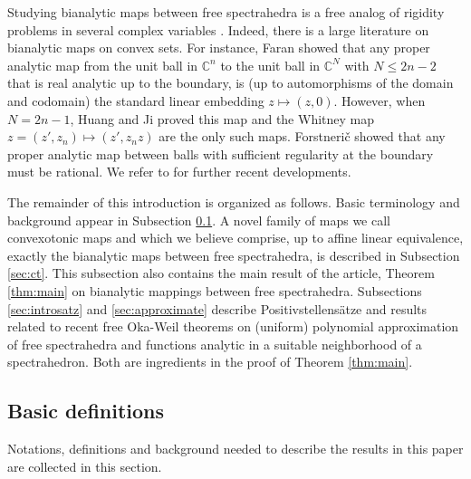 \documentclass[11pt,makeidx]{amsart}
\def\C{ {\mathbb{C}} }
\newcommand{\ct}{convexotonic\xspace}
\begin{document}
Studying bianalytic maps between free spectrahedra is a free analog of rigidity problems in  several complex variables \cite{DAn,For89,For,HJ01,HJY14,Krantz}. Indeed, there is a large literature  on bianalytic maps on convex sets. 
For instance, Faran \cite{Far86}
 showed that any proper analytic map from
the unit ball  in $\C^n$ to the unit ball in $\C^N$
 with $N\leq2n-2$
 that is real analytic up to the boundary, is 
(up to automorphisms of the domain and codomain) the standard 
linear embedding $z\mapsto (z,0)$.
However, when $N=2n-1$, Huang and Ji \cite{HJ01} proved
this map and the Whitney map $z=(z',z_n)\mapsto (z',z_n z)$
are the only such maps. 
Forstneri\v c
\cite{For}
showed that any proper analytic map between balls 
with sufficient regularity at the boundary
must be rational.
We refer to \cite{HJ01,HJY14} for further recent developments.



The remainder of this introduction is organized as follows. Basic terminology and background appear  in Subsection \ref{sec:basic}. A novel family of maps we call \ct maps and  which we believe comprise, up to affine linear equivalence, exactly the bianalytic maps between free spectrahedra, is described in Subsection \ref{sec:ct}.  This subsection also contains the main result of the article, Theorem \ref{thm:main} on bianalytic mappings between free spectrahedra. Subsections \ref{sec:introsatz} and \ref{sec:approximate} describe Positivstellens\"atze and results related to recent free Oka-Weil theorems \cite{AM14,BMV} on (uniform) polynomial approximation of free spectrahedra and  functions analytic in a suitable neighborhood of a spectrahedron. Both are ingredients in the proof of Theorem \ref{thm:main}.


\subsection{Basic definitions}
\label{sec:basic}
 Notations, definitions and background needed to describe the results in this paper are collected in this section.  
\end{document}

